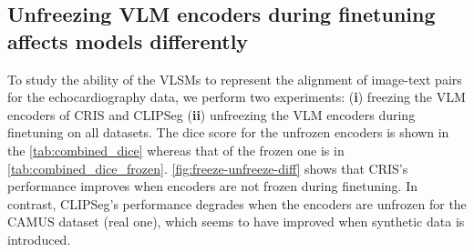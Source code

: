 \documentclass[runningheads]{llncs}
\begin{document}
\subsection{Unfreezing VLM encoders during finetuning affects models differently}

To study the ability of the VLSMs to represent the alignment of image-text pairs for the echocardiography data, we perform two experiments: (\textbf{i}) freezing the VLM encoders of CRIS and CLIPSeg (\textbf{ii}) unfreezing the VLM encoders during finetuning on all datasets.
The dice score for the unfrozen encoders is shown in the \cref{tab:combined_dice} whereas that of the frozen one is  in \cref{tab:combined_dice_frozen}.
\cref{fig:freeze-unfreeze-diff} shows that CRIS's performance improves when encoders are not frozen during finetuning.
In contrast, CLIPSeg's performance degrades when the encoders are unfrozen for the CAMUS dataset (real one), which seems to have improved when synthetic data is introduced.
\end{document}
